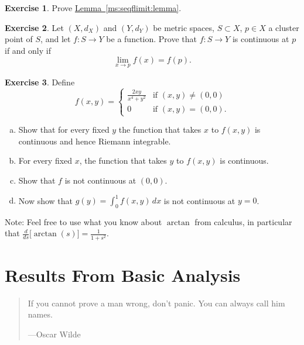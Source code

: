 \documentclass[12pt,openany]{book}
\theoremstyle{plain}
\theoremstyle{remark}
\theoremstyle{definition}
\newenvironment{exbox}{%
    \def\FrameCommand{\vrule width 1pt \relax\hspace {10pt}}%
    \MakeFramed {\advance \hsize -\width \FrameRestore }%
}{%
    \endMakeFramed
}
\newenvironment{exparts}{%
    \leavevmode\begin{enumerate}[a),noitemsep,topsep=0pt,parsep=0pt,partopsep=0pt]
}{%
    \end{enumerate}
}
\newenvironment{myquote}{%
    \begin{quote}%
    \begingroup\itshape
}{%
    \endgroup%
    \end{quote}
}
\theoremstyle{exercise}
\newtheorem{exercise}{Exercise}[section]
\theoremstyle{example}
\newcommand{\lemmaref}[1]{\hyperref[#1]{Lemma~\ref*{#1}}}
\begin{document}
\begin{exbox}
\begin{exercise}
Prove \lemmaref{ms:seqflimit:lemma}.
\end{exercise}

\begin{exercise}
Let $(X,d_X)$ and $(Y,d_Y)$ be metric spaces, $S \subset X$, $p \in X$
a cluster point of $S$, and let $f \colon S \to Y$ be a function.
Prove that
$f \colon S \to Y$ is continuous at $p$ if and only if
\begin{equation*}
\lim_{x \to p} f(x) = f(p) .
\end{equation*}
\end{exercise}

\begin{exercise}
Define
\begin{equation*}
f(x,y) =
\begin{cases}
\frac{2xy}{x^4+y^2} & \text{if $(x,y) \not= (0,0)$} \\
0 & \text{if $(x,y) = (0,0)$} .
\end{cases}
\end{equation*}
\begin{exparts}
\item
Show that for every fixed $y$ the function that takes $x$ to $f(x,y)$
is continuous and hence Riemann integrable.
\item
For every fixed $x$, the function that takes $y$ to $f(x,y)$ is continuous.
\item
Show that $f$ is not continuous at $(0,0)$.
\item
Now show that $g(y) = \int_0^1 f(x,y)\,dx$ is not continuous at $y=0$.
\end{exparts}
Note: Feel free to use what you know about $\arctan$ from calculus,
in particular that $\frac{d}{ds} \bigl[ \arctan(s) \bigr] = \frac{1}{1+s^2}$.
\end{exercise}
\end{exbox}


\chapter{Results From Basic Analysis} \label{ap:basicanal}

\begin{myquote}
If you cannot prove a man wrong, don't panic. You can always call him names.

---Oscar Wilde 
\end{myquote}
\end{document}
